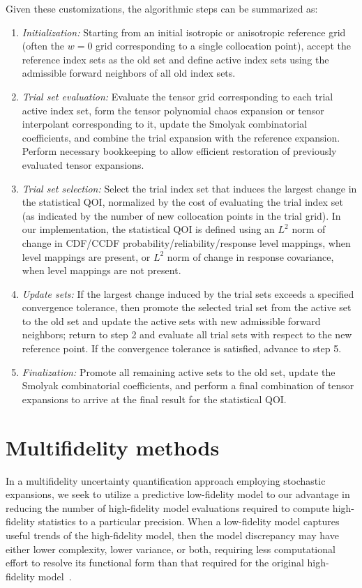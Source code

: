 Given these customizations, the algorithmic steps can be summarized as:
\begin{enumerate}
\item {\em Initialization:} Starting from an initial isotropic or
  anisotropic reference grid (often the $w=0$ grid corresponding to a
  single collocation point), accept the reference index sets as the
  old set and define active index sets using the admissible forward
  neighbors of all old index sets.
\item {\em Trial set evaluation:} Evaluate the tensor grid
  corresponding to each trial active index set, form the tensor
  polynomial chaos expansion or tensor interpolant corresponding to
  it, update the Smolyak combinatorial coefficients, and combine the
  trial expansion with the reference expansion.  Perform necessary
  bookkeeping to allow efficient restoration of previously evaluated
  tensor expansions.
\item {\em Trial set selection:} Select the trial index set that
  induces the largest change in the statistical QOI, normalized by the
  cost of evaluating the trial index set (as indicated by the number
  of new collocation points in the trial grid).  In our
  implementation, the statistical QOI is defined using an $L^2$ norm
  of change in CDF/CCDF probability/reliability/response level
  mappings, when level mappings are present, or $L^2$ norm of change
  in response covariance, when level mappings are not present.
\item {\em Update sets:} If the largest change induced by the trial
  sets exceeds a specified convergence tolerance, then promote the
  selected trial set from the active set to the old set and update the
  active sets with new admissible forward neighbors; return to step 2
  and evaluate all trial sets with respect to the new reference point.
  If the convergence tolerance is satisfied, advance to step 5.
\item {\em Finalization:} Promote all remaining active sets to the old
  set, update the Smolyak combinatorial coefficients, and perform a
  final combination of tensor expansions to arrive at the final result
  for the statistical QOI.
\end{enumerate}


\section{Multifidelity methods}\label{uq:expansion:multifid}


In a multifidelity uncertainty quantification approach employing
stochastic expansions, we seek to utilize a predictive low-fidelity
model to our advantage in reducing the number of high-fidelity model
evaluations required to compute high-fidelity statistics to a
particular precision.  When a low-fidelity model captures useful
trends of the high-fidelity model, then the model discrepancy may have
either lower complexity, lower variance, or both, requiring less
computational effort to resolve its functional form than that required
for the original high-fidelity model~\cite{NgEldred2012}.

